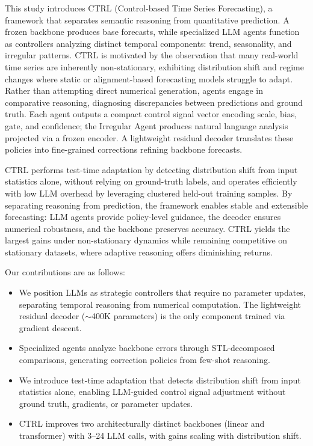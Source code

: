 This study introduces CTRL (Control-based Time Series Forecasting), a framework that separates semantic reasoning from quantitative prediction. A frozen backbone produces base forecasts, while specialized LLM agents function as controllers analyzing distinct temporal components: trend, seasonality, and irregular patterns. CTRL is motivated by the observation that many real-world time series are inherently
non-stationary, exhibiting distribution shift and regime changes where static or
alignment-based forecasting models struggle to adapt. Rather than attempting direct numerical generation, agents engage in comparative reasoning, diagnosing discrepancies between predictions and ground truth. Each agent outputs a compact control signal vector encoding scale, bias, gate, and confidence; the Irregular Agent produces natural language analysis projected via a frozen encoder. A lightweight residual decoder translates these policies into fine-grained corrections refining backbone forecasts.

CTRL performs test-time adaptation by detecting distribution shift from input statistics alone, without relying on ground-truth labels, and operates efficiently with low LLM overhead by leveraging clustered held-out training samples. By separating reasoning from prediction, the framework enables stable and extensible forecasting: LLM agents provide policy-level guidance, the decoder ensures numerical robustness, and the backbone preserves accuracy. CTRL yields the largest gains under non-stationary dynamics while remaining competitive on stationary datasets, where adaptive reasoning offers diminishing returns.






Our contributions are as follows:

\begin{itemize}
\item We position LLMs as strategic controllers that require no parameter updates, separating temporal reasoning from numerical computation. The lightweight residual decoder (${\sim}$400K parameters) is the only component trained via gradient descent.

\item Specialized agents analyze backbone errors through STL-decomposed comparisons, generating correction policies from few-shot reasoning.

\item We introduce test-time adaptation that detects distribution shift from input statistics alone, enabling LLM-guided control signal adjustment without ground truth, gradients, or parameter updates.


\item CTRL improves two architecturally distinct backbones (linear and transformer) with 3--24 LLM calls, with gains scaling with distribution shift.
\end{itemize}
